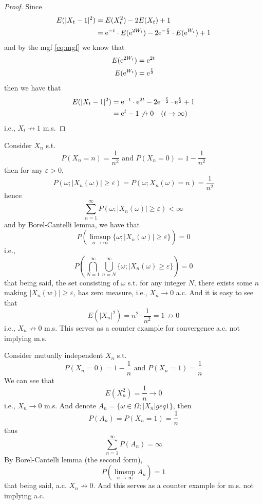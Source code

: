 \documentclass{homework}
\begin{document}
\begin{subproblem}
        \item
        \begin{proof}
            Since
            \[\begin{aligned}
                E(|X_t-1|^2)&=E(X_t^2)-2E(X_t)+1\\
                &=\mathrm e^{-t}\cdot E(\mathrm e^{2W_t})
                  -2\mathrm e^{-\frac t2}\cdot E(\mathrm e^{W_t})+1
            \end{aligned}\]
            and by the mgf \cref{eq:mgf} we know that
            \[\begin{aligned}
                E(\mathrm e^{2W_t})&=\mathrm e^{2t}\\
                E(\mathrm e^{W_t})&=\mathrm e^{\frac t2}\\
            \end{aligned}\]
            then we have that
            \[\begin{aligned}
                E(|X_t-1|^2)&=\mathrm e^{-t}\cdot\mathrm e^{2t}
                -2\mathrm e^{-\frac t2}\cdot\mathrm e^{\frac t2}+1\\
                &=\mathrm e^t-1\not\to 0\quad(t\to\infty)
            \end{aligned}\]
            i.e., $X_t\not\to 1$ m.s.
        \end{proof}

        \item
        Consider $X_n$ s.t.
        \[P(X_n=n)=\frac{1}{n^2}\text{ and }P(X_n=0)=1-\frac{1}{n^2}\]
        then for any $\varepsilon>0$,
        \[P(\omega;|X_n(\omega)|\geq\varepsilon)=P(\omega;X_n(\omega)=n)
        =\frac{1}{n^2}\]
        hence
        \[\sum_{n=1}^\infty P(\omega;|X_n(\omega)|\geq\varepsilon)<\infty\]
        and by Borel-Cantelli lemma, we have that
        \[P\left(\limsup_{n\to\infty}\{\omega;|X_n(\omega)|\geq\varepsilon\}\right)
        =0\]
        i.e.,
        \[P\left(\bigcap_{N=1}^\infty\bigcup_{n=N}^\infty
        \{\omega;|X_n(\omega)\geq\varepsilon\}\right)=0\]
        that being said, the set consisting of $\omega$ s.t.
        for any integer $N$,
        there exists some $n$ making $|X_n(w)|\geq\varepsilon$,
        has zero measure, i.e., $X_n\to 0$ a.c.
        And it is easy to see that
        \[E(|X_n|^2)=n^2\cdot\frac{1}{n^2}=1\not\to 0\]
        i.e., $X_n\not\to 0$ m.s. This serves as a counter example
        for convergence a.c. not implying m.s.

        Consider mutually independent $X_n$ s.t.
        \[P(X_n=0)=1-\frac{1}{n}\text{ and }
        P(X_n=1)=\frac{1}{n}\]
        We can see that
        \[E(X_n^2)=\frac{1}{n}\to 0\]
        i.e., $X_n\to 0$ m.s.
        And denote $A_n=\{\omega\in\Omega;|X_n|geq 1\}$,
        then
        \[P(A_n)=P(X_n=1)=\frac{1}{n}\]
        thus
        \[\sum_{n=1}^\infty P(A_n)=\infty\]
        By Borel-Cantelli lemma (the second form),
        \[P\left(\limsup_{n\to\infty}A_n\right)=1\]
        that being said,
        a.c. $X_n\not\to 0$. And this serves as a counter example
        for m.s. not implying a.c.


\end{subproblem}
\end{document}
